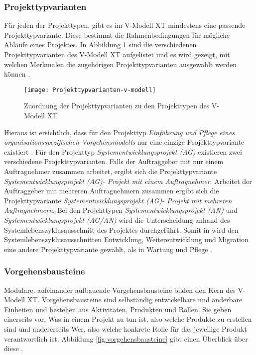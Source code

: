 \subsubsection{Projekttypvarianten}
Für jeden der Projekttypen, gibt es im V-Modell XT mindestens eine passende Projekttypvariante. Diese bestimmt die Rahmenbedingungen für mögliche Abläufe eines Projektes. In Abbildung \ref{fig:Projekttypen} sind die verschiedenen Projekttypvarianten des V-Modell XT aufgelistet und es wird gezeigt, mit welchen Merkmalen die zugehörigen Projekttypvarianten ausgewählt werden können \cite{2004vmodell}.   
\begin{figure}[htp]
\begin{center}
  \texttt{[image: Projekttypvarianten-v-modell]} %
  \caption{Zuordnung der Projekttypvarianten zu den Projekttypen des V-Modell XT \cite{2004vmodell}}
  \label{fig:Projekttypen}
\end{center}
\end{figure}
 Hieraus ist ersichtlich, dass für den Projekttyp \textit{Einführung und Pflege eines organisationsspezifischen Vorgehensmodells} nur eine einzige Projekttypvariante existiert \cite{2004vmodell}.\newline
Für den Projekttyp \textit{Systementwicklungsprojekt (AG)} existieren zwei verschiedene Projekttypvarianten. Falls der Auftraggeber mit nur einem Auftragnehmer zusammen arbeitet, ergibt sich die Projekttypvariante \textit{Systementwicklungsprojekt (AG)- Projekt mit einem Auftragnehmer}. Arbeitet der Auftraggeber mit mehreren Auftragnehmern zusammen ergibt sich die Projekttypvariante \textit{Systementwicklungsprojekt (AG)- Projekt mit mehreren Auftragnehmern}\cite{2004vmodell}.\newline
Bei den Projekttypen \textit{Systementwicklungsprojekt (AN)} und \textit{Systementwicklungsprojekt (AG/AN)} wird die Unterscheidung anhand des Systemlebenszyklusausschnitt des Projektes durchgeführt. Somit in wird den Systemlebenszyklusausschnitten Entwicklung, Weiterentwicklung und Migration eine andere Projekttypvariante gewählt, als in Wartung und Pflege \cite{2004vmodell}.\newline 
  
 \subsubsection{Vorgehensbausteine}
Modulare, aufeinander aufbauende Vorgehensbausteine bilden den Kern des V-Modell XT. Vorgehensbausteine sind selbständig entwickelbare und änderbare Einheiten und bestehen aus Aktivitäten, Produkten und Rollen. Sie geben einerseits vor, \grqq Was\grqq{}  in einem Projekt zu tun ist, also welche Produkte zu erstellen sind und andererseits \grqq Wer\grqq, also welche konkrete Rolle für das jeweilige Produkt verantwortlich ist. Abbildung \ref{fig:vorgehensbausteine} gibt einen Überblick über diese \cite{ruf2008, 2004vmodell}.\newline

